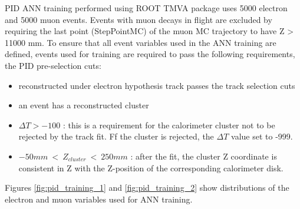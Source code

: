 PID ANN training performed using ROOT TMVA package uses 5000 electron and 5000 muon events.
Events with muon decays in flight are excluded by requiring the last point (StepPointMC)
of the muon MC trajectory to have Z > 11000 mm.
%
To ensure that all event variables used in the ANN training are defined, events used for training
are required to pass the following requirements, the PID pre-selection cuts:

\begin{itemize}
\item 
  reconstructed under electron hypothesis track passes the track selection cuts
\item 
  an event has a reconstructed cluster 
\item 
  $\Delta T > -100$ : this is a requirement for the calorimeter cluster not to be rejected by the track fit.
  Ff the cluster is rejected, the $\Delta T$ value set to -999.
\item
  $-50 mm ~<~ Z_{cluster} ~<~ 250 mm$ : after the fit, the cluster Z coordinate is consistent in Z with the
  Z-position of the corresponding calorimeter disk. 
\end{itemize}

Figures \ref{fig:pid_training_1} and \ref{fig:pid_training_2} show distributions of the electron
and muon variables used for ANN training.

